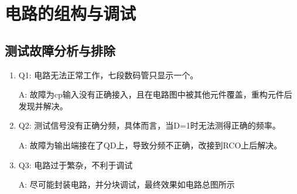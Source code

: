 \documentclass[UTF8,titlepage,a4paper]{ctexart}
\numberwithin{figure}{section}
\begin{document}
\clearpage
\section{电路的组构与调试}
\subsection{测试故障分析与排除}
\begin{enumerate}
    \item Q1: 电路无法正常工作，七段数码管只显示一个。
    
    A: 故障为cp输入没有正确接入，且在电路图中被其他元件覆盖，重构元件后发现并解决。

    \item Q2: 测试信号没有正确分频，具体而言，当D=1时无法测得正确的频率。
    
    A: 故障为输出端接在了QD上，导致分频不正确，改接到RCO上后解决。

    \item Q3: 电路过于繁杂，不利于调试
    
    A: 尽可能封装电路，并分块调试，最终效果如电路总图所示
\end{enumerate}
\end{document}
